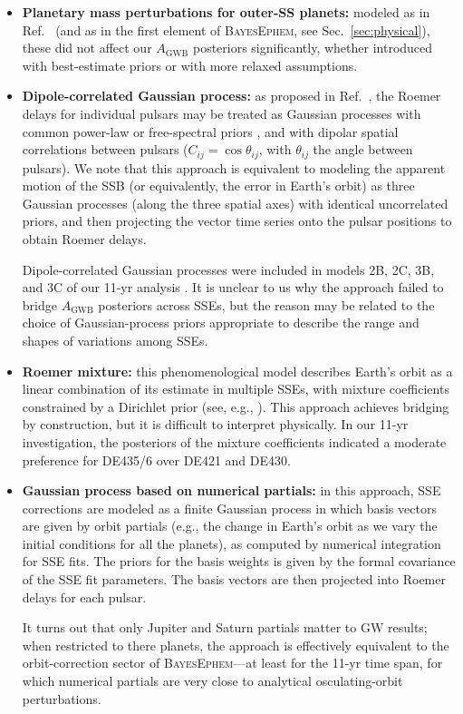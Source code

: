 \documentclass[reprint,
 amsmath,amssymb,
 aps,prd,floatfix,
]{revtex4-1}
\begin{document}
\begin{itemize}[leftmargin=*]
    \item \textbf{Planetary mass perturbations for outer-SS planets:} modeled as in Ref.\ \cite{2010ApJ...720L.201C} (and as in the first element of \textsc{BayesEphem}, see Sec.\ \ref{sec:physical}), these did not affect our $A_\mathrm{GWB}$ posteriors significantly, whether introduced with best-estimate priors \cite{iaumasses} or with more relaxed assumptions.
    \item \textbf{Dipole-correlated Gaussian process:}
    as proposed in Ref.\ \cite{2016MNRAS.455.4339T}, the Roemer delays for individual pulsars may be treated as Gaussian processes with common power-law or free-spectral priors \cite{vhv14}, and with dipolar spatial correlations between pulsars ($C_{ij} = \cos \theta_{ij}$, with $\theta_{ij}$ the angle between pulsars).
    We note that this approach is equivalent to modeling the apparent motion of the SSB (or equivalently, the error in Earth's orbit) as three Gaussian processes (along the three spatial axes) with identical uncorrelated priors, and then projecting the vector time series onto the pulsar positions to obtain Roemer delays.
    
    Dipole-correlated Gaussian processes were included in models 2B, 2C, 3B, and 3C of our 11-yr analysis \cite{2018ApJ...859...47A}.
    It is unclear to us why the approach failed to bridge $A_\mathrm{GWB}$ posteriors across SSEs, but the reason may be related to the choice of Gaussian-process priors appropriate to describe the range and shapes of variations among SSEs.
    \item \textbf{Roemer mixture:} this phenomenological model describes Earth's orbit as a linear combination of its estimate in multiple SSEs, with mixture coefficients constrained by a Dirichlet prior (see, e.g., \cite{gelman2013bayesian}). 
    This approach achieves bridging by construction, but it is difficult to interpret physically.
    In our 11-yr investigation, the posteriors of the mixture coefficients indicated a moderate preference for DE435/6 over DE421 and DE430.
    \item \textbf{Gaussian process based on numerical partials:} in this approach, SSE corrections are modeled as a finite Gaussian process \cite{williams2006gaussian} in which basis vectors are given by orbit partials (e.g., the change in Earth's orbit as we vary the initial conditions for all the planets), as computed by numerical integration for SSE fits. The priors for the basis weights is given by the formal covariance of the SSE fit parameters. The basis vectors are then projected into Roemer delays for each pulsar.
    
    It turns out that only Jupiter and Saturn partials matter to GW results; when restricted to there planets, the approach is effectively equivalent to the orbit-correction sector of \textsc{BayesEphem}---at least for the 11-yr time span, for which numerical partials are very close to analytical osculating-orbit perturbations.
\end{itemize}
\end{document}
